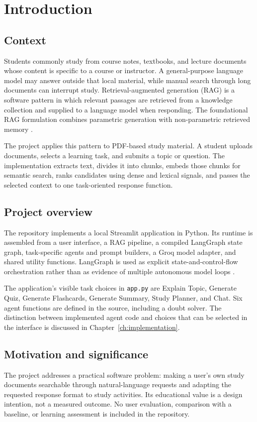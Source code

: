 \chapter{Introduction}
\label{ch:introduction}

\section{Context}
Students commonly study from course notes, textbooks, and lecture documents whose content is specific to a course or instructor. A general-purpose language model may answer outside that local material, while manual search through long documents can interrupt study. Retrieval-augmented generation (RAG) is a software pattern in which relevant passages are retrieved from a knowledge collection and supplied to a language model when responding. The foundational RAG formulation combines parametric generation with non-parametric retrieved memory \citep{lewis2020rag}.

The project applies this pattern to PDF-based study material. A student uploads documents, selects a learning task, and submits a topic or question. The implementation extracts text, divides it into chunks, embeds those chunks for semantic search, ranks candidates using dense and lexical signals, and passes the selected context to one task-oriented response function.

\section{Project overview}
The repository implements a local Streamlit application in Python. Its runtime is assembled from a user interface, a RAG pipeline, a compiled LangGraph state graph, task-specific agents and prompt builders, a Groq model adapter, and shared utility functions. LangGraph is used as explicit state-and-control-flow orchestration rather than as evidence of multiple autonomous model loops \citep{langgraphdocs}.

The application's visible task choices in \texttt{app.py} are Explain Topic, Generate Quiz, Generate Flashcards, Generate Summary, Study Planner, and Chat. Six agent functions are defined in the source, including a doubt solver. The distinction between implemented agent code and choices that can be selected in the interface is discussed in Chapter~\ref{ch:implementation}.

\section{Motivation and significance}
The project addresses a practical software problem: making a user's own study documents searchable through natural-language requests and adapting the requested response format to study activities. Its educational value is a design intention, not a measured outcome. No user evaluation, comparison with a baseline, or learning assessment is included in the repository.

